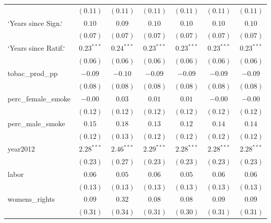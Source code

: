 \begin{table}[!h]
\begin{center}
\begin{tabular}{l c c c c c c }
                        & $(0.11)$     & $(0.11)$     & $(0.11)$     & $(0.11)$     & $(0.11)$     & $(0.11)$     \\
`Years since Sign.`     & $0.10$       & $0.09$       & $0.10$       & $0.10$       & $0.10$       & $0.10$       \\
                        & $(0.07)$     & $(0.07)$     & $(0.07)$     & $(0.07)$     & $(0.07)$     & $(0.07)$     \\
`Years since Ratif.`    & $0.23^{***}$ & $0.24^{***}$ & $0.23^{***}$ & $0.23^{***}$ & $0.23^{***}$ & $0.23^{***}$ \\
                        & $(0.06)$     & $(0.06)$     & $(0.06)$     & $(0.06)$     & $(0.06)$     & $(0.06)$     \\
tobac\_prod\_pp         & $-0.09$      & $-0.10$      & $-0.09$      & $-0.09$      & $-0.09$      & $-0.09$      \\
                        & $(0.08)$     & $(0.08)$     & $(0.08)$     & $(0.08)$     & $(0.08)$     & $(0.08)$     \\
perc\_female\_smoke     & $-0.00$      & $0.03$       & $0.01$       & $0.01$       & $-0.00$      & $-0.00$      \\
                        & $(0.12)$     & $(0.12)$     & $(0.12)$     & $(0.12)$     & $(0.12)$     & $(0.12)$     \\
perc\_male\_smoke       & $0.15$       & $0.18$       & $0.13$       & $0.12$       & $0.14$       & $0.14$       \\
                        & $(0.12)$     & $(0.13)$     & $(0.12)$     & $(0.12)$     & $(0.12)$     & $(0.12)$     \\
year2012                & $2.28^{***}$ & $2.46^{***}$ & $2.29^{***}$ & $2.28^{***}$ & $2.28^{***}$ & $2.28^{***}$ \\
                        & $(0.23)$     & $(0.27)$     & $(0.23)$     & $(0.23)$     & $(0.23)$     & $(0.23)$     \\
labor                   & $0.06$       & $0.05$       & $0.06$       & $0.05$       & $0.06$       & $0.06$       \\
                        & $(0.13)$     & $(0.13)$     & $(0.13)$     & $(0.13)$     & $(0.13)$     & $(0.13)$     \\
womens\_rights          & $0.09$       & $0.32$       & $0.08$       & $0.08$       & $0.09$       & $0.09$       \\
                        & $(0.31)$     & $(0.34)$     & $(0.31)$     & $(0.30)$     & $(0.31)$     & $(0.31)$     \\

\end{tabular}
\end{center}
\end{table}
